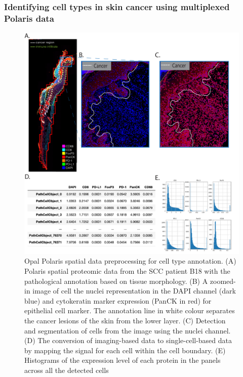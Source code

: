 \subsubsection{Identifying cell types in skin cancer using multiplexed Polaris data}
\begin{figure}[htp]
    \centering
    \includegraphics[width=\columnwidth]{Chapter3/Figures/Chap3_Figure1_1.png}
    \caption[Schematic of spatial data preprocessing for cell type annotation.]{ Opal Polaris spatial data preprocessing for cell type annotation. (A) Polaris spatial proteomic data from the SCC patient B18 with the pathological annotation based on tissue morphology. (B) A zoomed-in image of cell the nuclei representation in the DAPI channel (dark blue) and cytokeratin marker expression (PanCK in red) for epithelial cell marker. The annotation line in white colour separates the cancer lesions of the skin from the lower layer. (C) Detection and segmentation of cells from the image using the nuclei channel. (D) The conversion of imaging-based data to single-cell-based data by mapping the  signal for each cell within the cell boundary. (E) Histograms of the expression level of each protein in the panels across all the detected cells}
    \label{fig:Polaris_skin_cancer_preprocessing}
\end{figure}

